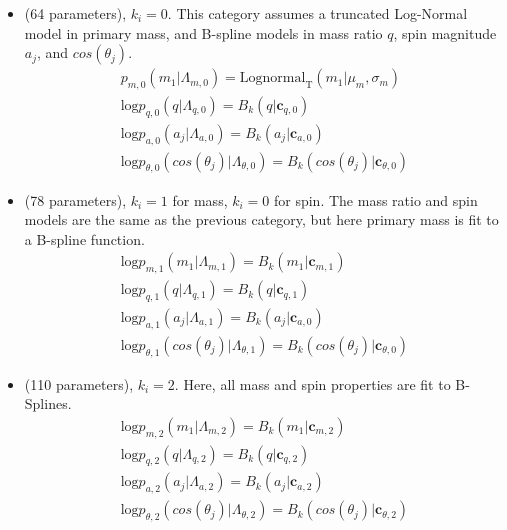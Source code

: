 \begin{itemize}
    \item \first{} (64 parameters), $k_i=0$. This category assumes a truncated Log-Normal model in primary mass, and B-spline models in mass ratio $q$, spin magnitude $a_j$, and $cos(\theta_{j})$. 
    \begin{eqnarray} \label{eq:peakAcomp}
        p_{m,0}(m_1| \Lambda_{m,0}) = \text{Lognormal}_\text{T}(m_1 | \mu_{m}, \sigma_{m}) \\
        \text{log} p_{q,0}(q| \Lambda_{q,0}) = B_k(q | \mathbf{c}_{q,0}) \\
        \text{log} p_{a,0}(a_j| \Lambda_{a,0}) = B_k(a_j | \mathbf{c}_{a,0}) \\
        \text{log} p_{\theta,0}(cos(\theta_j)| \Lambda_{\theta,0}) = B_k( cos(\theta_j) | \mathbf{c}_{\theta,0})
    \end{eqnarray}

    \item \contA{} (78 parameters), $k_i=1$ for mass, $k_i = 0$ for spin. The mass ratio and spin models are the same as the previous category, but here primary mass is fit to a B-spline function. 
    \begin{eqnarray} \label{eq:contAcomp}
        \text{log} p_{m,1}(m_1| \Lambda_{m,1}) = B_k(m_1 | \mathbf{c}_{m, 1}) \\
        \text{log} p_{q,1}(q| \Lambda_{q,1}) = B_k(q | \mathbf{c}_{q,1}) \\
        \text{log} p_{a,1}(a_j| \Lambda_{a,1}) = B_k(a_j | \mathbf{c}_{a,0}) \\
        \text{log} p_{\theta,1}(cos(\theta_j)| \Lambda_{\theta,1}) = B_k( cos(\theta_j) | \mathbf{c}_{\theta,0})
    \end{eqnarray}

    \item \contB{} (110 parameters), $k_i=2$. Here, all mass and spin properties are fit to B-Splines.
    \begin{eqnarray} \label{eq:contBcomp}
        \text{log} p_{m,2}(m_1| \Lambda_{m,2}) = B_k(m_1 | \mathbf{c}_{m, 2}) \\
        \text{log} p_{q,2}(q| \Lambda_{q,2}) = B_k(q | \mathbf{c}_{q,2}) \\
        \text{log} p_{a,2}(a_j| \Lambda_{a,2}) = B_k(a_j | \mathbf{c}_{a,2}) \\
        \text{log} p_{\theta,2}(cos(\theta_j)| \Lambda_{\theta,2}) = B_k( cos(\theta_j) | \mathbf{c}_{\theta,2})
    \end{eqnarray}
\end{itemize}